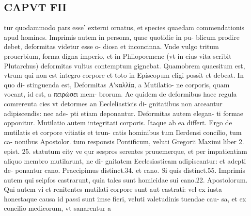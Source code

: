 \documentclass{article}
\begin{document}
\begin{pages}
\section*{CAPVT  FII }
\marginpar{[ p.123 ]}\pstart tur quodammodo pars esse' externi ornatus, et species quaedam commendationis apud homines. Imprimis autem in persona, quae quotidie in pu- blicum prodire debet, deformitas videtur esse o- diosa et inconcinna. Vnde vulgo tritum prouerbium, forma digna imperio, et in Philopoemene (vt in eius vita scribit Plutarchus) deformitas vultus contemptum gignebat. Quamobrem quaesitum est, vtrum qui non est integro corpore et toto in Episcopum eligi possit et debeat. In quo di- stinguenda est, Deformitas Αʹκαλλία, a Mutilatio- ne corporis, quam vocant, id est, a πειρώσει mem- brorum. Ac quidem de deformibus haec regula comrereuta cies vt detormes an Eecleliasticis di- gnitatibus non arceantur adipiscendis: nec ade- pti etiam deponantur. Deformitas autem elegan- ti formae opponitur. Mutilatio autem integritati corporis. Itaque ab ea differt.  \pend\pstart Ergo de mutilatis et corpore vitiatis et trun- catis hominibus tum Ilerdensi concilio, tum ca- nonibus Apostolor. tum responsis Pontificum, veluti Gregorii Maximi liber 2. epist. 25. statutum eity ve qur sespros serentes pruuemerque, et per impatientiam aliquo membro mutilarunt, ne di- gnitatem Ecclesiasticam adipiscantur: et adepti de- ponantur cano. Praecipimus distinct.34. et cano. Si quis distinct.55. Imprimis autem qui seipfos castrarunt, quia tales sunt homicidae sui cano.22. Apostolorum.  \pend\pstart Qui autem vi et renitentes mutilati corpore sunt aut castrati: vel ex iusta honestaque causa id passi sunt imse fieri, veluti valetudinis tuendae cau- sa, et ex concilio medicorum, vt sanarentur a  \pend

\end{pages}
\end{document}
